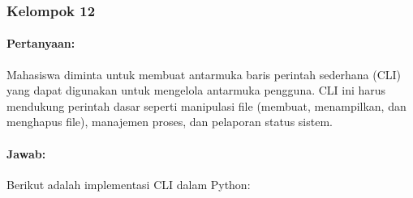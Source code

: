 \documentclass[12pt]{article}
\begin{document}
\subsubsection{Kelompok 12}

\paragraph{Pertanyaan:} Mahasiswa diminta untuk membuat antarmuka baris perintah sederhana (CLI) yang dapat digunakan untuk mengelola antarmuka pengguna. CLI ini harus mendukung perintah dasar seperti manipulasi file (membuat, menampilkan, dan menghapus file), manajemen proses, dan pelaporan status sistem.

\paragraph{Jawab:} Berikut adalah implementasi CLI dalam Python:
\end{document}
